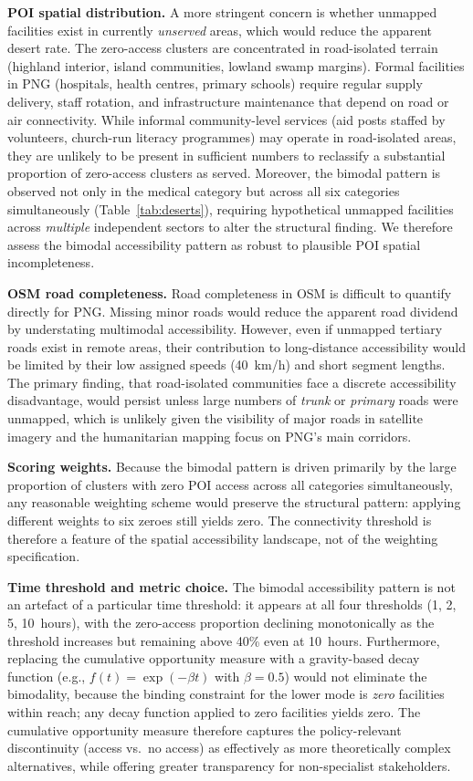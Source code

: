\documentclass[review,3p,authoryear]{elsarticle}
\begin{document}
\textbf{POI spatial distribution.} A more stringent concern is whether unmapped facilities exist in currently \textit{unserved} areas, which would reduce the apparent desert rate. The zero-access clusters are concentrated in road-isolated terrain (highland interior, island communities, lowland swamp margins). Formal facilities in PNG (hospitals, health centres, primary schools) require regular supply delivery, staff rotation, and infrastructure maintenance that depend on road or air connectivity. While informal community-level services (aid posts staffed by volunteers, church-run literacy programmes) may operate in road-isolated areas, they are unlikely to be present in sufficient numbers to reclassify a substantial proportion of zero-access clusters as served. Moreover, the bimodal pattern is observed not only in the medical category but across all six categories simultaneously (Table~\ref{tab:deserts}), requiring hypothetical unmapped facilities across \textit{multiple} independent sectors to alter the structural finding. We therefore assess the bimodal accessibility pattern as robust to plausible POI spatial incompleteness.

\textbf{OSM road completeness.} Road completeness in OSM is difficult to quantify directly for PNG. Missing minor roads would reduce the apparent road dividend by understating multimodal accessibility. However, even if unmapped tertiary roads exist in remote areas, their contribution to long-distance accessibility would be limited by their low assigned speeds (\SI{40}{\kilo\metre/\hour}) and short segment lengths. The primary finding, that road-isolated communities face a discrete accessibility disadvantage, would persist unless large numbers of \textit{trunk} or \textit{primary} roads were unmapped, which is unlikely given the visibility of major roads in satellite imagery and the humanitarian mapping focus on PNG's main corridors.

\textbf{Scoring weights.} Because the bimodal pattern is driven primarily by the large proportion of clusters with zero POI access across all categories simultaneously, any reasonable weighting scheme would preserve the structural pattern: applying different weights to six zeroes still yields zero. The connectivity threshold is therefore a feature of the spatial accessibility landscape, not of the weighting specification.

\textbf{Time threshold and metric choice.} The bimodal accessibility pattern is not an artefact of a particular time threshold: it appears at all four thresholds (1, 2, 5, 10~hours), with the zero-access proportion declining monotonically as the threshold increases but remaining above 40\% even at 10~hours. Furthermore, replacing the cumulative opportunity measure with a gravity-based decay function (e.g., $f(t) = \exp(-\beta t)$ with $\beta = 0.5$) would not eliminate the bimodality, because the binding constraint for the lower mode is \textit{zero} facilities within reach; any decay function applied to zero facilities yields zero. The cumulative opportunity measure therefore captures the policy-relevant discontinuity (access vs.\ no access) as effectively as more theoretically complex alternatives, while offering greater transparency for non-specialist stakeholders.
\end{document}
